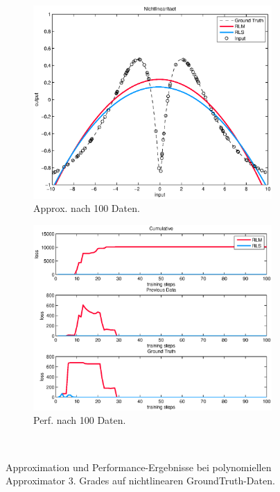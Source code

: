 \documentclass[a4paper, 12pt]{article}
\begin{document}
{\begin{figure}[H]
\begin{subfigure}[b]{0.3\textwidth}
                \includegraphics[width=\textwidth]{./images/copyofstats/nonlin3_approx_100.eps}
                \caption{Approx. nach 100 Daten.}
                \label{fig:apx:nichtlinear:approx100}
        \end{subfigure}
        \begin{subfigure}[b]{0.3\textwidth}
                \centering
                \includegraphics[width=\textwidth]{./images/copyofstats/nonlin3_perf_100.eps}
                \caption{Perf. nach 100 Daten.}
                \label{fig:apx:nichtlinear:perf100}
        \end{subfigure}
        \\
        \caption{Approximation und Performance-Ergebnisse bei polynomiellen Approximator 3. Grades auf nichtlinearen GroundTruth-Daten.}
        \label{fig:apx:nichtlinear}
\end{figure}

}
\end{document}
